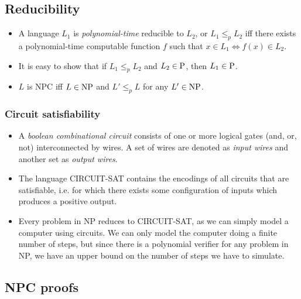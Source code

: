 \subsection{Reducibility}
\begin{itemize}
\item A language $L_1$ is \emph{polynomial-time} reducible to $L_2$,
  or $L_1 \leq_p L_2$ iff there exists a polynomial-time computable
  function $f$ such that $x \in L_1 \iff f(x) \in L_2$.
\item It is easy to show that if $L_1 \leq_p L_2$ and $L_2 \in \P$,
  then $L_1 \in \P$.
\item $L$ is NPC iff $L \in \NP$ and $L' \leq_p L$ for any $L' \in
  \NP$.
\end{itemize}

\subsubsection{Circuit satisfiability}
\begin{itemize}
\item A \emph{boolean combinational circuit} consists of one or more
  logical gates (and, or, not) interconnected by wires. A set of wires
  are denoted as \emph{input wires} and another set as \emph{output
    wires}.
\item The language CIRCUIT-SAT contains the encodings of all circuits
  that are satisfiable, i.e. for which there exists some configuration
  of inputs which produces a positive output.
\item Every problem in NP reduces to CIRCUIT-SAT, as we can simply
  model a computer using circuits. We can only model the computer
  doing a finite number of steps, but since there is a polynomial
  verifier for any problem in NP, we have an upper bound on the number
  of steps we have to simulate.
\end{itemize}

\subsection{NPC proofs}

